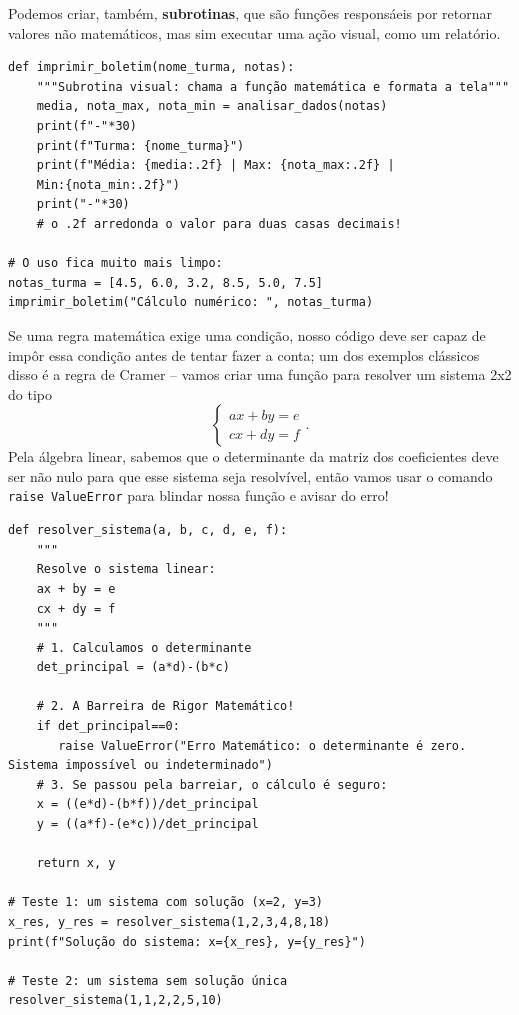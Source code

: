 \documentclass[../numerical_methods.tex]{subfiles}
\begin{document}
Podemos criar, também, \textbf{subrotinas}, que são funções responsáeis por retornar valores não matemáticos, mas sim executar uma ação visual, como um relatório.
\begin{listing}[H]
	\caption{Subrotina: formatar o código de um boletim.}
	\begin{verbatim}
def imprimir_boletim(nome_turma, notas):
    """Subrotina visual: chama a função matemática e formata a tela"""
    media, nota_max, nota_min = analisar_dados(notas)
    print(f"-"*30)
    print(f"Turma: {nome_turma}")
    print(f"Média: {media:.2f} | Max: {nota_max:.2f} |
    Min:{nota_min:.2f}")
    print("-"*30)
    # o .2f arredonda o valor para duas casas decimais!

# O uso fica muito mais limpo: 
notas_turma = [4.5, 6.0, 3.2, 8.5, 5.0, 7.5]
imprimir_boletim("Cálculo numérico: ", notas_turma)
\end{verbatim}
\end{listing}

Se uma regra matemática exige uma condição, nosso código deve ser capaz de impôr essa condição antes de tentar fazer a conta; um dos exemplos clássicos disso é a regra de Cramer -- vamos criar uma função para resolver um sistema 2x2 do tipo
\[
	\left\{\begin{array}{ll}
		ax +by = e \\
		cx + dy = f
	\end{array}\right..
\]
Pela álgebra linear, sabemos que o determinante da matriz dos coeficientes deve ser não nulo para que esse sistema seja resolvível, então vamos usar o comando \texttt{raise ValueError} para blindar nossa função e avisar do erro!
\begin{listing}[H]
	\caption{Calculo de Determinante Sensível a Erro}
	\begin{verbatim}
def resolver_sistema(a, b, c, d, e, f):
    """
    Resolve o sistema linear: 
    ax + by = e 
    cx + dy = f
    """
    # 1. Calculamos o determinante 
    det_principal = (a*d)-(b*c)
    
    # 2. A Barreira de Rigor Matemático!
    if det_principal==0:
       raise ValueError("Erro Matemático: o determinante é zero. Sistema impossível ou indeterminado")
    # 3. Se passou pela barreiar, o cálculo é seguro: 
    x = ((e*d)-(b*f))/det_principal 
    y = ((a*f)-(e*c))/det_principal
    
    return x, y

# Teste 1: um sistema com solução (x=2, y=3)
x_res, y_res = resolver_sistema(1,2,3,4,8,18)
print(f"Solução do sistema: x={x_res}, y={y_res}")

# Teste 2: um sistema sem solução única
resolver_sistema(1,1,2,2,5,10)
 
 \end{verbatim}
\end{listing}
\end{document}
